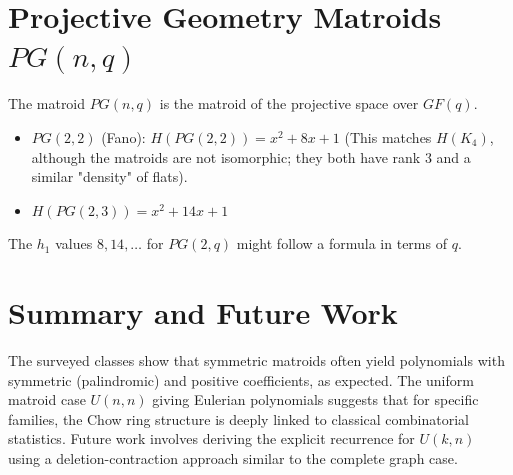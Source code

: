 \documentclass{article}
\begin{document}
\section{Projective Geometry Matroids $PG(n, q)$}
The matroid $PG(n, q)$ is the matroid of the projective space over $GF(q)$.
\begin{itemize}
    \item $PG(2, 2)$ (Fano): $H(PG(2, 2)) = x^2 + 8x + 1$ (This matches $H(K_4)$, although the matroids are not isomorphic; they both have rank 3 and a similar "density" of flats).
    \item $H(PG(2, 3)) = x^2 + 14x + 1$
\end{itemize}
The $h_1$ values $8, 14, \dots$ for $PG(2, q)$ might follow a formula in terms of $q$.

\section{Summary and Future Work}
The surveyed classes show that symmetric matroids often yield polynomials with symmetric (palindromic) and positive coefficients, as expected. The uniform matroid case $U(n,n)$ giving Eulerian polynomials suggests that for specific families, the Chow ring structure is deeply linked to classical combinatorial statistics. Future work involves deriving the explicit recurrence for $U(k, n)$ using a deletion-contraction approach similar to the complete graph case.
\end{document}
